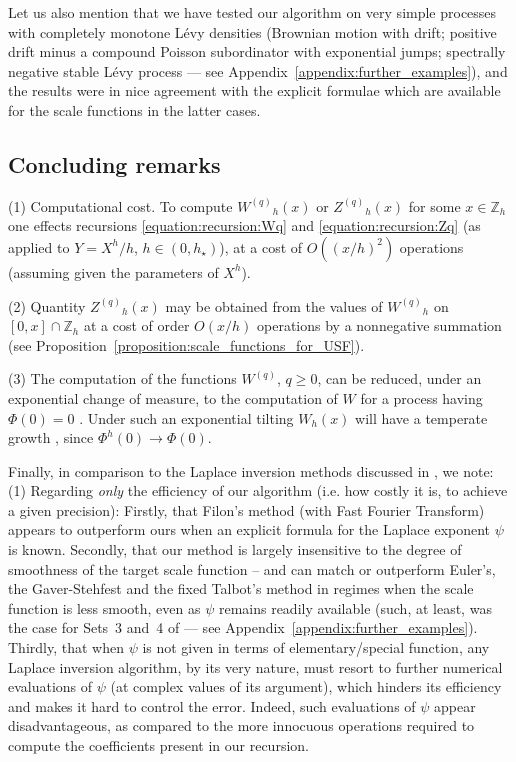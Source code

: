 \documentclass[pdftex,oneside,11pt,reqno]{amsart}
\theoremstyle{definition}
\theoremstyle{theorem}
\theoremstyle{remark}
\numberwithin{equation}{section}
\numberwithin{definition}{section}
\begin{document}
Let us also mention that we have tested our algorithm on 
very simple processes with completely monotone L\'evy densities \cite{albrecher} (Brownian motion with drift; positive drift minus a compound Poisson subordinator with exponential jumps; spectrally negative stable L\'evy process --- see Appendix~\ref{appendix:further_examples}), and the results were in nice agreement with the explicit formulae which are available for the scale functions in the latter cases.

\subsection{Concluding remarks}

 

(1) Computational cost. To compute ${W^{(q)}}_h(x)$ or ${Z^{(q)}}_h(x)$ for some $x\in {\mathbb{Z}_h}$ one effects recursions \eqref{equation:recursion:Wq} and \eqref{equation:recursion:Zq} (as applied to $Y=X^h/h$, $h\in (0,h_\star)$), at a cost of $O((x/h)^2)$ operations (assuming given the parameters of $X^h$). 

\noindent 
(2) Quantity ${Z^{(q)}}_h(x)$ may be obtained from the values of ${W^{(q)}}_h$ on
$[0,x]\cap {\mathbb{Z}_h}$ at a cost of order $O(x/h)$ operations by a nonnegative summation
(see Proposition~\ref{proposition:scale_functions_for_USF}). 

\noindent 
 
(3) The computation of the functions ${W^{(q)}}$, $q\geq 0$, can be reduced, under an exponential change of measure, to the computation of $W$  \cite[p. 222, Lemma~8.4]{kyprianou} for a process having $\Phi(0)=0$ \cite{surya}. Under such an exponential tilting $W_h(x)$ will have a temperate growth \cite[Proposition 4.8(ii)]{vidmar:fluctuation_theory}, since $\Phi^h(0)\to \Phi(0)$. \noindent

Finally, in comparison to the Laplace inversion methods discussed in \cite[Section~5.6]{kuznetsovkyprianourivero}, we note: 
\noindent (1)  Regarding \emph{only} the efficiency of our algorithm (i.e. how costly it is, to achieve a given precision): Firstly, that Filon's method (with Fast Fourier Transform) appears to outperform ours when an explicit formula for the Laplace exponent $\psi$ is known. Secondly, that our method is largely insensitive to the degree of smoothness of the target scale function -- and can match or outperform Euler's, the Gaver-Stehfest and the fixed Talbot's method in regimes when the scale function is less smooth, even as $\psi$ remains readily available (such, at least, was the case for Sets~3 and~4 of \cite[pp. 177-178]{kuznetsovkyprianourivero} --- see Appendix~\ref{appendix:further_examples}). Thirdly, that when $\psi$  is not given in terms of elementary/special function, any Laplace inversion algorithm, by its very nature, must resort to further numerical evaluations of $\psi$ (at complex values of its argument), which hinders its efficiency and makes it hard to control the error. Indeed, such evaluations of $\psi$ appear disadvantageous, as compared to the more innocuous operations required to compute the coefficients present in our recursion. 
\end{document}
